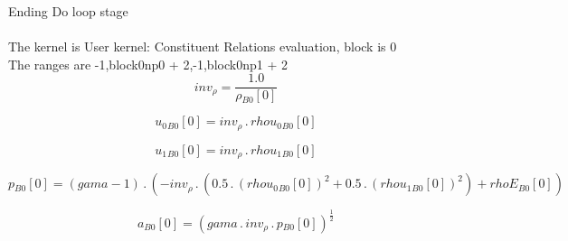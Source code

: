 \documentclass{article}
\begin{document}
\noindent Ending Do loop stage\\
\\\noindent The kernel is User kernel: Constituent Relations evaluation, block is 0\\\noindent The ranges are -1,block0np0 + 2,-1,block0np1 + 2\\\begin{dmath}inv_{\rho} = \frac{1.0}{{\rho{_{B0}}}[{0}]}\end{dmath}

\begin{dmath}{u_{0}{_{B0}}}[{0}] = inv_{\rho} \,.\, {rhou_{0}{_{B0}}}[{0}]\end{dmath}

\begin{dmath}{u_{1}{_{B0}}}[{0}] = inv_{\rho} \,.\, {rhou_{1}{_{B0}}}[{0}]\end{dmath}

\begin{dmath}{p{_{B0}}}[{0}] = \left(gama - 1\right) \,.\, \left(- inv_{\rho} \,.\, \left(0.5 \,.\, \left({rhou_{0}{_{B0}}}[{0}] \right)^{2} + 0.5 \,.\, \left({rhou_{1}{_{B0}}}[{0}] \right)^{2}\right) + {rhoE{_{B0}}}[{0}]\right)\end{dmath}

\begin{dmath}{a{_{B0}}}[{0}] = \left(gama \,.\, inv_{\rho} \,.\, {p{_{B0}}}[{0}] \right)^{\frac{1}{2}}\end{dmath}
\end{document}
